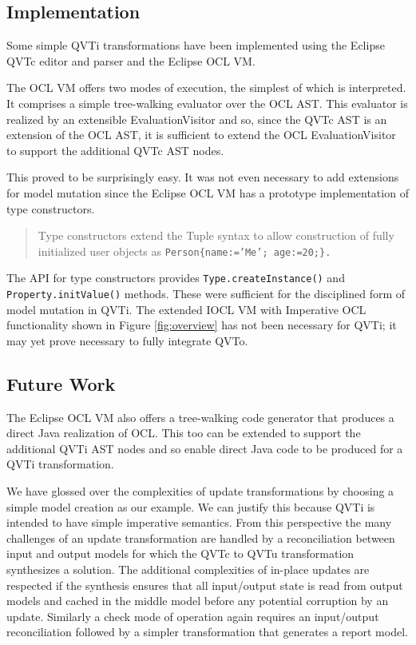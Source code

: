 

\subsection{Implementation}
Some simple QVTi transformations have been implemented using the Eclipse QVTc editor and parser and the Eclipse OCL VM\cite{Willink2012}.

The OCL VM offers two modes of execution, the simplest of which is interpreted. It comprises a simple tree-walking evaluator over the OCL AST. This evaluator is realized by an extensible EvaluationVisitor and so, since the QVTc AST is an extension of the OCL AST, it is sufficient to extend the OCL EvaluationVisitor to support the additional QVTc AST nodes.

This proved to be surprisingly easy. It was not even necessary to add extensions for model mutation since the Eclipse OCL VM has a prototype implementation of type constructors.

\begin{quotation}
Type constructors extend the Tuple syntax to allow construction of fully initialized user objects as \texttt{Person\{name:='Me'; age:=20;\}.}
\end{quotation}

The API for type constructors provides \texttt{Type.createInstance()} and \texttt{Pro\-per\-ty.initValue()} methods. These were sufficient for the disciplined form of model mutation in QVTi. The extended IOCL VM with Imperative OCL functionality shown in  Figure \ref{fig:overview} has not been necessary for QVTi; it may yet prove necessary to fully integrate QVTo.

\subsection{Future Work}
The Eclipse OCL VM also offers a tree-walking code generator that produces a direct Java realization of OCL. This too can be extended to support the additional QVTi AST nodes and so enable direct Java code to be produced for a QVTi transformation. 

We have glossed over the complexities of update transformations by choosing a simple model creation as our example. We can justify this because QVTi is intended to have simple imperative semantics. From this perspective the many challenges of an update transformation are handled by a reconciliation between input and output models for which the QVTc to QVTu transformation synthesizes a solution. The additional complexities of in-place updates are respected if the synthesis ensures that all input/output state is read from output models and cached in the middle model before any potential corruption by an update. Similarly a check mode of operation again requires an input/output reconciliation followed by a simpler transformation that generates a report model.

